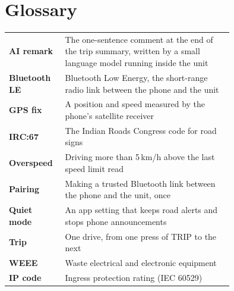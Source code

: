 \documentclass[11pt,a4paper,oneside]{report}
\newcommand{\ui}[1]{\textsf{#1}}
\begin{document}
\chapter{Glossary}
\begin{tabular}{lp{0.75\linewidth}}
\textbf{AI remark} & The one-sentence comment at the end of the trip summary, written by a small language model running inside the unit\\
\textbf{Bluetooth LE} & Bluetooth Low Energy, the short-range radio link between the phone and the unit\\
\textbf{GPS fix} & A position and speed measured by the phone's satellite receiver\\
\textbf{IRC:67} & The Indian Roads Congress code for road signs\\
\textbf{Overspeed} & Driving more than 5\,km/h above the last speed limit read\\
\textbf{Pairing} & Making a trusted Bluetooth link between the phone and the unit, once\\
\textbf{Quiet mode} & An app setting that keeps road alerts and stops phone announcements\\
\textbf{Trip} & One drive, from one press of \ui{TRIP} to the next\\
\textbf{WEEE} & Waste electrical and electronic equipment\\
\textbf{IP code} & Ingress protection rating (IEC 60529)\\
\end{tabular}

\clearpage{}
\printindex
\end{document}
